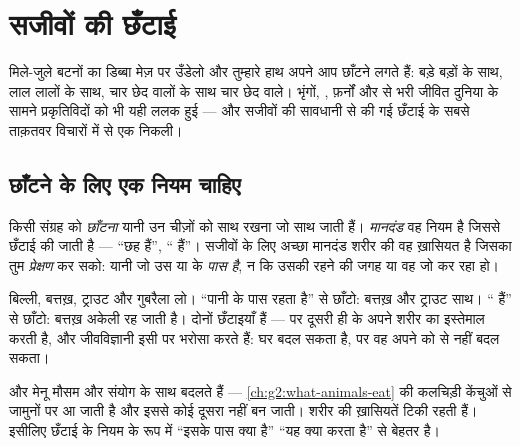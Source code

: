 \chapter{सजीवों की छँटाई}\label{ch:g3:sorting-living-things}

मिले-जुले बटनों का डिब्बा मेज़ पर उँडेलो और तुम्हारे हाथ अपने आप छाँटने
लगते हैं: बड़े बड़ों के साथ, लाल लालों के साथ, चार छेद वालों के साथ
चार छेद वाले। भृंगों, , फ़र्नों और  से भरी जीवित दुनिया
के सामने प्रकृतिविदों को भी यही ललक हुई --- और सजीवों की सावधानी से
की गई छँटाई  के सबसे ताक़तवर विचारों में से एक निकली।

\section{छाँटने के लिए एक नियम चाहिए}

\begin{definition}[छँटाई और मानदंड]\label{def:g3:sorting-living-things:criterion}
किसी संग्रह को \emph{छाँटना} यानी उन चीज़ों को साथ रखना जो
साथ जाती हैं। \emph{मानदंड} वह नियम है जिससे छँटाई की
जाती है --- ``छह  हैं'', `` हैं''। सजीवों के लिए अच्छा मानदंड
शरीर की वह ख़ासियत है जिसका तुम \emph{प्रेक्षण} कर सको: यानी जो उस 
या  के \emph{पास है}, न कि उसकी रहने की जगह या वह जो कर रहा हो।
\end{definition}

\begin{example}[एक ही जंतुओं की दो छँटाइयाँ]\label{ex:g3:sorting-living-things:two}
बिल्ली, बत्तख़, ट्राउट और गुबरैला लो। ``पानी के पास रहता है'' से छाँटो:
बत्तख़ और ट्राउट साथ। `` हैं'' से छाँटो: बत्तख़ अकेली रह जाती है।
दोनों छँटाइयाँ हैं --- पर दूसरी ही  के अपने शरीर का इस्तेमाल करती
है, और जीवविज्ञानी इसी पर भरोसा करते हैं:  घर बदल सकता है, पर वह
अपने  को  से नहीं बदल सकता।
\end{example}

\begin{remark}[घर या मेनू से क्यों न छाँटें?]\label{rem:g3:sorting-living-things:why}
 और मेनू मौसम और संयोग के साथ बदलते हैं ---
\cref{ch:g2:what-animals-eat} की कलचिड़ी केंचुओं से जामुनों पर आ जाती
है और इससे कोई दूसरा  नहीं बन जाती। शरीर की ख़ासियतें टिकी रहती
हैं। इसीलिए छँटाई के नियम के रूप में ``इसके पास क्या है'' ``यह क्या
करता है'' से बेहतर है।
\end{remark}

